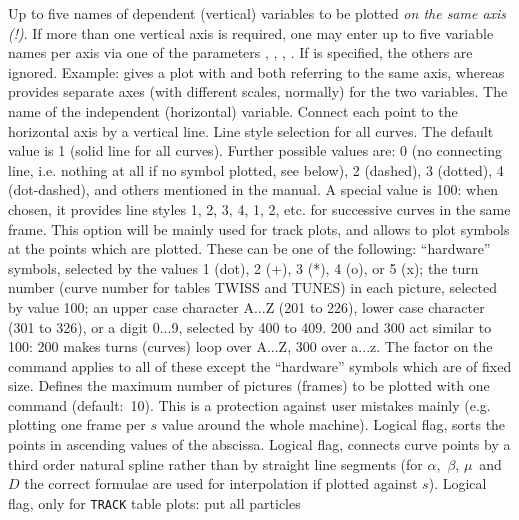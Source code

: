 \begin{mylist}
Up to five names of dependent (vertical) variables to be plotted
{\em on the same axis (!)}.
If more than one vertical axis is required, one may enter up
to five variable names per axis via one of the parameters
, , , .
If  is specified, the others are ignored.
Example:
gives a plot with  and 
both referring to the same axis, whereas
provides separate axes (with different scales, normally)
for the two variables.
The name of the independent (horizontal) variable.
Connect each point to the horizontal axis by a vertical line.
Line style selection for all curves.
The default value is 1 (solid line for all curves).
Further possible values are: 0 (no connecting line, i.e.
nothing at all if no symbol plotted, see below), 2 (dashed), 3 (dotted),
4 (dot-dashed), and others mentioned in the  manual.
A special value is 100: when chosen, it provides line styles 1, 2, 3, 4,
1, 2, etc. for successive curves in the same frame.
This option will be mainly used for track plots, and
allows to plot symbols at the points which are plotted.
These can be one of the following:
``hardware'' symbols, selected by the values 1 (dot),
2 (+), 3 (*), 4 (o), or 5 (x);
the turn number (curve number for tables TWISS and TUNES)
in each picture, selected by value 100;
an upper case character A...Z (201 to 226), lower case character (301
to 326), or a digit 0...9, selected by 400 to 409. 200 and 300 act
similar to 100: 200 makes turns (curves) loop over A...Z,
300 over a...z.
The  factor on the  command
applies to all of these except
the ``hardware'' symbols which are of fixed size.
Defines the maximum number of pictures (frames) to be plotted
with one command (default:~10).
This is a protection against user mistakes mainly
(e.g. plotting one frame per \(s\) value around the whole machine).
Logical flag, sorts the points in ascending
values of the abscissa.
Logical flag, connects
curve points by a third order natural spline rather than
by straight line segments
(for \(\alpha\),~\(\beta\), \(\mu\)~and~\(D\) the correct formulae are
used for interpolation if plotted against \(s\)).
Logical flag, only for {\tt TRACK} table plots: put all particles

\end{mylist}

